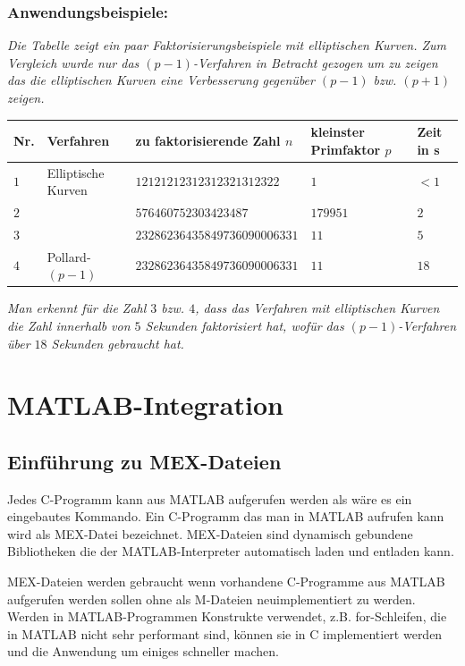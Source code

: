 \documentclass[10pt, bigheadings]{scrartcl}
\begin{document}
\subsubsection*{Anwendungsbeispiele:}
{\it
Die Tabelle zeigt ein paar Faktorisierungsbeispiele mit elliptischen Kurven.
Zum Vergleich wurde nur das $(p-1)$-Verfahren in Betracht gezogen um zu 
zeigen das die elliptischen Kurven eine Verbesserung gegenüber $(p-1)$ bzw.
$(p+1)$ zeigen.
}
\begin{center}
\begin{tabular}{|l|l|l|l|l|}
\hline
Nr. & Verfahren & zu faktorisierende Zahl $n$ & kleinster Primfaktor $p$ & Zeit in s\\
\hline
$1$& Elliptische Kurven & $12121212312312321312322$ & $1$ & $<1$\\
\hline
$2$&	& $576460752303423487$ & $179951$ & $2$\\
\hline
$3$&	& $23286236435849736090006331$ & $11$ & $5$\\
\hline
$4$& Pollard-$(p-1)$	& $23286236435849736090006331$ & $11$ & $18$\\
\hline
\end{tabular}
\end{center}
{\it
Man erkennt für die Zahl $3$ bzw. $4$, dass das Verfahren mit elliptischen 
Kurven die Zahl innerhalb von $5$ Sekunden faktorisiert hat, wofür das
$(p-1)$-Verfahren über $18$ Sekunden gebraucht hat. 
}



\newpage

\section{MATLAB-Integration}
\subsection{Einführung zu MEX-Dateien}
Jedes C-Programm kann aus MATLAB aufgerufen werden als wäre es
ein eingebautes Kommando. Ein C-Programm das man in MATLAB
aufrufen kann wird als MEX-Datei bezeichnet. MEX-Dateien sind
dynamisch gebundene Bibliotheken die der MATLAB-Interpreter
automatisch laden und entladen kann.

MEX-Dateien werden gebraucht wenn vorhandene C-Programme aus MATLAB
aufgerufen werden sollen ohne als M-Dateien neuimplementiert zu
werden. Werden in MATLAB-Programmen Konstrukte verwendet, z.B.
for-Schleifen, die in MATLAB nicht sehr performant sind, können sie in
C implementiert werden und die Anwendung um einiges schneller machen.
\end{document}
